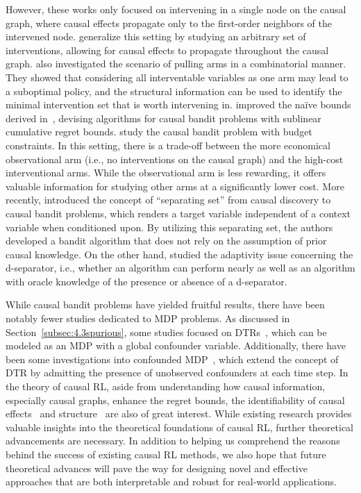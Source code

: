 \documentclass[10pt]{article} %
\theoremstyle{definition}
\begin{document}
However, these works only focused on intervening in a single node on the causal graph, where causal effects propagate only to the first-order neighbors of the intervened node. \citet{yabeCausalBanditsPropagating2018a} generalize this setting by studying an arbitrary set of interventions, allowing for causal effects to propagate throughout the causal graph.
\citet{leeStructuralCausalBandits2018a} also investigated the scenario of pulling arms in a combinatorial manner. They showed that considering all interventable variables as one arm may lead to a suboptimal policy, and the structural information can be used to identify the minimal intervention set that is worth intervening in.
\citet{luCausalBanditsUnknown2021a} improved the naïve bounds derived in~\citet{lattimoreCausalBanditsLearning2016a}, devising algorithms for causal bandit problems with sublinear cumulative regret bounds.
\citet{nairBudgetedNonBudgetedCausal2021a} study the causal bandit problem with budget constraints. In this setting, there is a trade-off between the more economical observational arm (i.e., no interventions on the causal graph) and the high-cost interventional arms. While the observational arm is less rewarding, it offers valuable information for studying other arms at a significantly lower cost.
More recently, \citet{kroonCausalBanditsPrior2022a} introduced the concept of ``separating set'' from causal discovery to causal bandit problems, which renders a target variable independent of a context variable when conditioned upon. By utilizing this separating set, the authors developed a bandit algorithm that does not rely on the assumption of prior causal knowledge. 
On the other hand, \citet{bilodeauAdaptivelyExploitingDSeparators2022a} studied the adaptivity issue concerning the d-separator, i.e., whether an algorithm can perform nearly as well as an algorithm with oracle knowledge of the presence or absence of a d-separator.


While causal bandit problems have yielded fruitful results, there have been notably fewer studies dedicated to MDP problems. As discussed in Section~\ref{subsec:4.3spurious}, some studies focused on DTRs~\citep{zhangNearOptimalReinforcementLearning2019a, zhangDesigningOptimalDynamic2020a}, which can be modeled as an MDP with a global confounder variable. Additionally, there have been some investigations into confounded MDP~\citep{zhangMarkovDecisionProcesses, wangProvablyEfficientCausal2021a}, which extend the concept of  DTR by admitting the presence of unobserved confounders at each time step. In the theory of causal RL, aside from understanding how causal information, especially causal graphs, enhance the regret bounds, the identifiability of causal effects~\citep{zhangCausalImitationLearning2020a,luEfficientReinforcementLearning2022a} and structure~\citep{huangAdaRLWhatWhere2022a} are also of great interest. While existing research provides valuable insights into the theoretical foundations of causal RL, further theoretical advancements are necessary. In addition to helping us comprehend the reasons behind the success of existing causal RL methods, we also hope that future theoretical advances will pave the way for designing novel and effective approaches that are both interpretable and robust for real-world applications. 
\end{document}
